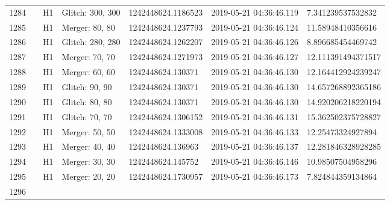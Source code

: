 \begin{longtable}{lllllll}
1284 &                                                    &       H1 &  Glitch: 300, 300 &  1242448624.1186523 &  2019-05-21 04:36:46.119 &   7.341239537532832 \\
1285 &                                                    &       H1 &    Merger: 80, 80 &  1242448624.1237793 &  2019-05-21 04:36:46.124 &   11.58948410356616 \\
1286 &                                                    &       H1 &  Glitch: 280, 280 &  1242448624.1262207 &  2019-05-21 04:36:46.126 &   8.896685454469742 \\
1287 &                                                    &       H1 &    Merger: 70, 70 &  1242448624.1271973 &  2019-05-21 04:36:46.127 &  12.111391494371517 \\
1288 &                                                    &       H1 &    Merger: 60, 60 &   1242448624.130371 &  2019-05-21 04:36:46.130 &  12.164412924239247 \\
1289 &                                                    &       H1 &    Glitch: 90, 90 &   1242448624.130371 &  2019-05-21 04:36:46.130 &  14.657268892365186 \\
1290 &                                                    &       H1 &    Glitch: 80, 80 &   1242448624.130371 &  2019-05-21 04:36:46.130 &  14.920206218220194 \\
1291 &                                                    &       H1 &    Glitch: 70, 70 &  1242448624.1306152 &  2019-05-21 04:36:46.131 &  15.362502375728827 \\
1292 &                                                    &       H1 &    Merger: 50, 50 &  1242448624.1333008 &  2019-05-21 04:36:46.133 &   12.25473324927894 \\
1293 &                                                    &       H1 &    Merger: 40, 40 &   1242448624.136963 &  2019-05-21 04:36:46.137 &  12.281846328928285 \\
1294 &                                                    &       H1 &    Merger: 30, 30 &   1242448624.145752 &  2019-05-21 04:36:46.146 &   10.98507504958296 \\
1295 &                                                    &       H1 &    Merger: 20, 20 &  1242448624.1730957 &  2019-05-21 04:36:46.173 &   7.824844359134864 \\
1296 &                                                    &          &                   &                     &                          &                     \\

\end{longtable}
